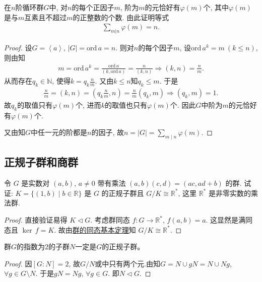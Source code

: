 \documentclass[../../main.tex]{subfiles}%
\begin{document}
\begin{example}
在$n$阶循环群$G$中, 对$n$的每个正因子$m$, 阶为$m$的元恰好有$\varphi(m)$个, 其中$\varphi(m)$是与$m$互素且不超过$m$的正整数的个数. 由此证明等式
\begin{align*}
\sum\limits_{m|n}\varphi(m)=n.
\end{align*}
\end{example}
\begin{proof}
设$G=\left< a \right>$, $|G|=\mathrm{ord}\,a=n$. 则对$n$的每个因子$m$, 设$\mathrm{ord}\,a^k=m\ (k\leqslant n)$, 则由知
\begin{align*}
m=\mathrm{ord}\,a^k=\frac{\mathrm{ord}\,a}{(k,\mathrm{ord}\,a)}=\frac{n}{(k,n)}\Longrightarrow (k,n)=\frac{n}{m}.
\end{align*}
从而存在$q_k\in\mathbb{N}$, 使得$k=q_k\frac{n}{m}$. 又由$k\leqslant n$知$q_k\leqslant m$. 于是
\begin{align*}
\frac{n}{m}=(k,n)=\left(q_k\frac{n}{m},n\right)=\frac{n}{m}(q_k,m)\Longrightarrow (q_k,m)=1.
\end{align*}
故$q_k$的取值只有$\varphi(m)$个, 进而$k$的取值也只有$\varphi(m)$个. 因此$G$中阶为$m$的元恰好有$\varphi(m)$个.

又由知$G$中任一元的阶都是$n$的因子, 故$n=|G|=\sum\limits_{m\mid n}\varphi(m).$
\end{proof}

\subsection{正规子群和商群}

\begin{example}
令 \(G\) 是实数对 \((a, b)\), \(a \neq 0\) 带有乘法 \((a, b)(c, d) = (ac, ad + b)\) 的群.
试证: \(K = \{(1, b) \mid b \in \mathbb{R}\}\) 是 \(G\) 的正规子群且 \(G/K \cong \mathbb{R}^*\), 这里 \(\mathbb{R}^*\) 是非零实数的乘法群.
\end{example}
\begin{proof}
直接验证易得 \(K \lhd G\). 考虑群同态 \(f: G \to \mathbb{R}^*\), \(f(a, b) = a\). 这显然是满同态且 \(\operatorname{ker}\,f = K\). 故由\hyperref[theorem:群的同态基本定理]{群的同态基本定理}知 \(G/K \cong \mathbb{R}^*\).
\end{proof}

\begin{proposition}\label{proposition:指数为2的子群必是正规子群}
群$G$的指数为$2$的子群$N$一定是$G$的正规子群。
\end{proposition}
\begin{proof}
因$[G:N]=2$, 故$G/N$或中只有两个元.由知$G=N\cup gN=N\cup Ng$, $\forall g\in G\setminus N$. 于是$gN=Ng$, $\forall g\in G$. 即$N\lhd G$.
\end{proof}
\end{document}
